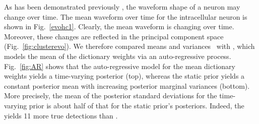 As has been demonstrated previously \cite{calabrese2011kalman}, the waveform shape of a neuron may change over time.  The mean waveform over time for the intracellular neuron is shown in Fig.\ \ref{evohc1}.  Clearly, the mean waveform is changing over time.  Moreover, these changes are reflected in the principal component space (Fig.\ \ref{fig:clusterevo}).  We therefore compared means and variances \smug\ with \smug{}, which models the mean of the dictionary weights via an auto-regressive process.  Fig.\ \ref{fig:AR} shows that the auto-regressive model for the mean dictionary weights yields a time-varying posterior (top), whereas the static prior yields a constant posterior mean with increasing posterior marginal variances (bottom).  More precisely, the mean of the posterior standard deviations for the time-varying prior is about half of that for the static prior's posteriors. 
Indeed, the \smug{} yields 11 more true detections than \smug.
 


